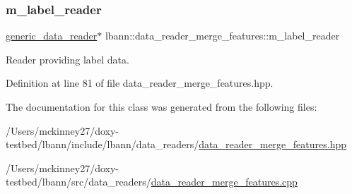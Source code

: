 \subsubsection{\texorpdfstring{m\+\_\+label\+\_\+reader}{m\_label\_reader}}
{\footnotesize\ttfamily \hyperlink{classlbann_1_1generic__data__reader}{generic\+\_\+data\+\_\+reader}$\ast$ lbann\+::data\+\_\+reader\+\_\+merge\+\_\+features\+::m\+\_\+label\+\_\+reader\hspace{0.3cm}{\ttfamily [protected]}}



Reader providing label data. 



Definition at line 81 of file data\+\_\+reader\+\_\+merge\+\_\+features.\+hpp.



The documentation for this class was generated from the following files\+:\begin{DoxyCompactItemize}
\item 
/\+Users/mckinney27/doxy-\/testbed/lbann/include/lbann/data\+\_\+readers/\hyperlink{data__reader__merge__features_8hpp}{data\+\_\+reader\+\_\+merge\+\_\+features.\+hpp}\item 
/\+Users/mckinney27/doxy-\/testbed/lbann/src/data\+\_\+readers/\hyperlink{data__reader__merge__features_8cpp}{data\+\_\+reader\+\_\+merge\+\_\+features.\+cpp}\end{DoxyCompactItemize}
